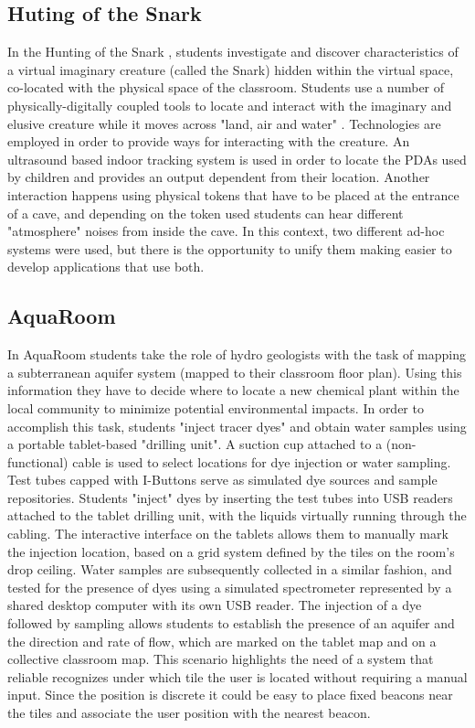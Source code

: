 \subsection{Huting of the Snark}
In the Hunting of the Snark \cite{price:snark}, students investigate and discover characteristics of a virtual imaginary creature (called the Snark) hidden within the virtual space, co-located with the physical space of the classroom. Students use a number of physically-digitally coupled tools to locate and interact with the imaginary and elusive creature while it moves across "land, air and water" \cite{price:snark}. Technologies are employed in order to provide ways for interacting with the creature. An ultrasound based indoor tracking system is used in order to locate the PDAs used by children and provides an output dependent from their location. Another interaction happens using physical tokens that have to be placed at the entrance of a cave, and depending on the token used students can hear different "atmosphere" noises from inside the cave. In this context, two different ad-hoc systems were used, but there is the opportunity to unify them making easier to develop applications that use both.

\subsection{AquaRoom}
In AquaRoom \cite{novellis:acqua_room} students take the role of hydro geologists with the task of mapping a subterranean aquifer system (mapped to their classroom floor plan). Using this information they have to decide where to locate a new chemical plant within the local community to minimize potential environmental impacts. In order to accomplish this task, students "inject tracer dyes" and obtain water samples using a portable tablet-based "drilling unit". A suction cup attached to a (non-functional) cable is used to select locations for dye injection or water sampling. Test tubes capped with I-Buttons serve as simulated dye sources and sample repositories. Students "inject" dyes by inserting the test tubes into USB readers attached to the tablet drilling unit, with the liquids virtually running through the cabling. The interactive interface on the tablets allows them to manually mark the injection location, based on a grid system defined by the tiles on the room’s drop ceiling. Water samples are subsequently collected in a similar fashion, and tested for the presence of dyes using a simulated spectrometer represented by a shared desktop computer with its own USB reader. The injection of a dye followed by sampling allows students to establish the presence of an aquifer and the direction and rate of flow, which are marked on the tablet map and on a collective classroom map. This scenario highlights the need of a system that reliable recognizes under which tile the user is located without requiring a manual input. Since the position is discrete it could be easy to place fixed beacons near the tiles and associate the user position with the nearest beacon.

